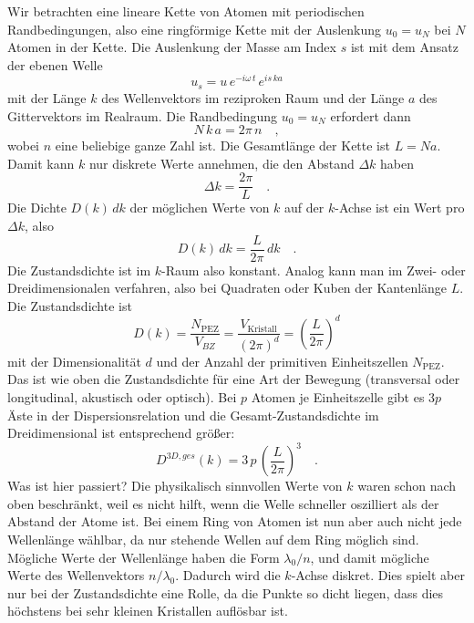 Wir betrachten eine lineare Kette von Atomen mit periodischen Randbedingungen, also eine ringförmige Kette mit der Auslenkung $u_0 = u_N$ bei $N$ Atomen in der Kette.  Die Auslenkung der Masse am Index $s$ ist mit dem Ansatz der ebenen Welle
\begin{equation}
 u_s = u \, e^{- i \omega \, t} \, e^{i s \, k a}
\end{equation}
mit der Länge $k$ des Wellenvektors im reziproken Raum und der Länge $a$ des  Gittervektors  im  Realraum. Die Randbedingung $u_0 = u_N$ erfordert dann
\begin{equation}
 N \, k \, a = 2 \pi \, n \quad ,
\end{equation}
wobei $n$ eine beliebige ganze Zahl ist.
Die Gesamtlänge der Kette ist $L = N a$. Damit kann $k$ nur diskrete Werte annehmen, die den Abstand $\Delta k$ haben
\begin{equation}
\Delta  k = \frac{2 \pi }{L}  \quad .
\end{equation}
Die Dichte $ D(k) \, dk$ der möglichen Werte von $k$ auf der $k$-Achse ist ein Wert pro $\Delta k$, also
\begin{equation}
 D(k) \, dk = \frac{L}{2 \pi} \, dk  \quad .
\end{equation}
Die Zustandsdichte ist im $k$-Raum also konstant.
Analog kann man im Zwei- oder Dreidimensionalen verfahren, also bei Quadraten oder Kuben der Kantenlänge $L$. Die Zustandsdichte ist
\begin{equation}
D(k) = \frac{N_\text{PEZ}}{V_{BZ}}  = 
\frac{V_\text{Kristall}} {(2 \pi)^d} =
 \left(\frac{L}{2 \pi} \right)^d 
\end{equation}
mit der Dimensionalität $d$ und der Anzahl der primitiven Einheitszellen $N_\text{PEZ}$. Das ist wie oben die Zustandsdichte für eine Art der Bewegung (transversal oder longitudinal, akustisch oder optisch). Bei $p$ Atomen je Einheitszelle gibt es $3p$ Äste in der Dispersionsrelation und die Gesamt-Zustandsdichte im Dreidimensional ist entsprechend größer:
\begin{equation}
  D^{3D, ges}(k) =  3 \, p \,   \left(\frac{L}{2 \pi} \right)^3 \quad .
  \end{equation}
Was ist hier passiert? Die physikalisch sinnvollen Werte von $k$ waren schon nach oben beschränkt, weil es nicht hilft, wenn die Welle schneller oszilliert als der Abstand der Atome ist. Bei einem Ring von Atomen ist nun aber auch nicht jede Wellenlänge wählbar, da nur stehende Wellen auf dem Ring möglich sind. Mögliche Werte der Wellenlänge haben die Form $\lambda_0 / n$, und damit mögliche Werte des Wellenvektors $n / \lambda_0$. Dadurch wird die $k$-Achse diskret. Dies spielt aber nur bei der Zustandsdichte eine Rolle, da die Punkte so dicht liegen, dass dies höchstens bei sehr kleinen Kristallen auflösbar ist.

